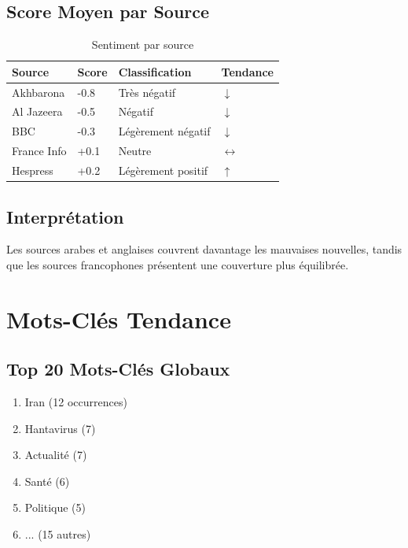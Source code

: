 \documentclass[12pt,a4paper]{report}
\begin{document}
\subsection{Score Moyen par Source}

\begin{table}[H]
    \centering
    \begin{tabular}{llll}
        \toprule
        \textbf{Source} & \textbf{Score} & \textbf{Classification} & \textbf{Tendance} \\
        \midrule
        Akhbarona       & -0.8           & Très négatif            & $\downarrow$      \\
        Al Jazeera      & -0.5           & Négatif                 & $\downarrow$      \\
        BBC             & -0.3           & Légèrement négatif      & $\downarrow$      \\
        France Info     & +0.1           & Neutre                  & $\leftrightarrow$ \\
        Hespress        & +0.2           & Légèrement positif      & $\uparrow$        \\
        \bottomrule
    \end{tabular}
    \caption{Sentiment par source}
\end{table}

\subsection{Interprétation}

Les sources arabes et anglaises couvrent davantage les mauvaises nouvelles, tandis que les sources francophones présentent une couverture plus équilibrée.

\section{Mots-Clés Tendance}

\subsection{Top 20 Mots-Clés Globaux}

\begin{enumerate}
    \item Iran (12 occurrences)
    \item Hantavirus (7)
    \item Actualité (7)
    \item Santé (6)
    \item Politique (5)
    \item ... (15 autres)
\end{enumerate}
\end{document}
